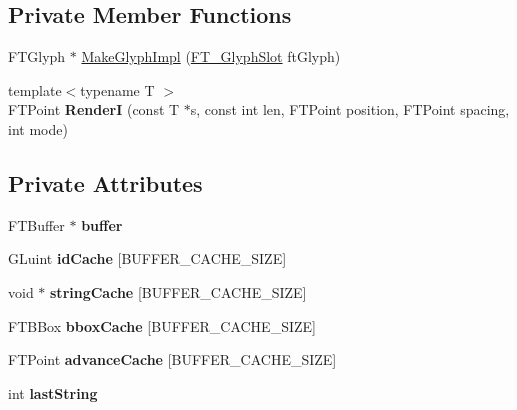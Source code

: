 \subsection*{Private Member Functions}
\begin{DoxyCompactItemize}
\item 
F\+T\+Glyph $\ast$ \hyperlink{class_f_t_buffer_font_impl_afeea306987cfae334dd6b9d4aff50fac}{Make\+Glyph\+Impl} (\hyperlink{struct_f_t___glyph_slot_rec__}{F\+T\+\_\+\+Glyph\+Slot} ft\+Glyph)
\item 
{\footnotesize template$<$typename T $>$ }\\F\+T\+Point {\bfseries RenderI} (const T $\ast$s, const int len, F\+T\+Point position, F\+T\+Point spacing, int mode)\hypertarget{class_f_t_buffer_font_impl_af46e2fbe45a51e23ccbdfe6b43e086c5}{}\label{class_f_t_buffer_font_impl_af46e2fbe45a51e23ccbdfe6b43e086c5}

\end{DoxyCompactItemize}
\subsection*{Private Attributes}
\begin{DoxyCompactItemize}
\item 
F\+T\+Buffer $\ast$ {\bfseries buffer}\hypertarget{class_f_t_buffer_font_impl_a74e12422492ddf3762ac2a268656ec5f}{}\label{class_f_t_buffer_font_impl_a74e12422492ddf3762ac2a268656ec5f}

\item 
G\+Luint {\bfseries id\+Cache} \mbox{[}B\+U\+F\+F\+E\+R\+\_\+\+C\+A\+C\+H\+E\+\_\+\+S\+I\+ZE\mbox{]}\hypertarget{class_f_t_buffer_font_impl_aff4ad26d8c8bb826b9076949de09c9cd}{}\label{class_f_t_buffer_font_impl_aff4ad26d8c8bb826b9076949de09c9cd}

\item 
void $\ast$ {\bfseries string\+Cache} \mbox{[}B\+U\+F\+F\+E\+R\+\_\+\+C\+A\+C\+H\+E\+\_\+\+S\+I\+ZE\mbox{]}\hypertarget{class_f_t_buffer_font_impl_aaf682f9b04cb4e3c901cbe93abd7995a}{}\label{class_f_t_buffer_font_impl_aaf682f9b04cb4e3c901cbe93abd7995a}

\item 
F\+T\+B\+Box {\bfseries bbox\+Cache} \mbox{[}B\+U\+F\+F\+E\+R\+\_\+\+C\+A\+C\+H\+E\+\_\+\+S\+I\+ZE\mbox{]}\hypertarget{class_f_t_buffer_font_impl_a9f93ddce892f2b2d1cb4757ee3aa5458}{}\label{class_f_t_buffer_font_impl_a9f93ddce892f2b2d1cb4757ee3aa5458}

\item 
F\+T\+Point {\bfseries advance\+Cache} \mbox{[}B\+U\+F\+F\+E\+R\+\_\+\+C\+A\+C\+H\+E\+\_\+\+S\+I\+ZE\mbox{]}\hypertarget{class_f_t_buffer_font_impl_a091bdc32b64fe3427b8fabefa9d5ba4d}{}\label{class_f_t_buffer_font_impl_a091bdc32b64fe3427b8fabefa9d5ba4d}

\item 
int {\bfseries last\+String}\hypertarget{class_f_t_buffer_font_impl_a1bb58c51f010816d9f6c0f7319078fb7}{}\label{class_f_t_buffer_font_impl_a1bb58c51f010816d9f6c0f7319078fb7}

\end{DoxyCompactItemize}
